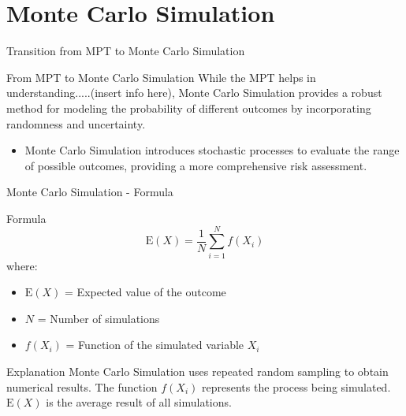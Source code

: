 \documentclass{beamer}
\begin{document}
\section{Monte Carlo Simulation}
\begin{frame}{Transition from MPT to Monte Carlo Simulation}
  \begin{block}{From MPT to Monte Carlo Simulation}
    While the MPT helps in understanding.....(insert info here), Monte Carlo Simulation provides a robust method for modeling the probability of different outcomes by incorporating randomness and uncertainty.
    \begin{itemize}
      \item Monte Carlo Simulation introduces stochastic processes to evaluate the range of possible outcomes, providing a more comprehensive risk assessment.
    \end{itemize}
  \end{block}
\end{frame}

\begin{frame}{Monte Carlo Simulation - Formula}
  \begin{block}{Formula}
    \begin{equation*}
      \text{E}(X) = \frac{1}{N} \sum_{i=1}^{N} f(X_i)
    \end{equation*}
    where:
    \begin{itemize}
      \item \( \text{E}(X) \) = Expected value of the outcome
      \item \( N \) = Number of simulations
      \item \( f(X_i) \) = Function of the simulated variable \( X_i \)
    \end{itemize}
  \end{block}
  \begin{block}{Explanation}
    Monte Carlo Simulation uses repeated random sampling to obtain numerical results. The function \( f(X_i) \) represents the process being simulated. \( \text{E}(X) \) is the average result of all simulations.
  \end{block}
\end{frame}
\end{document}
